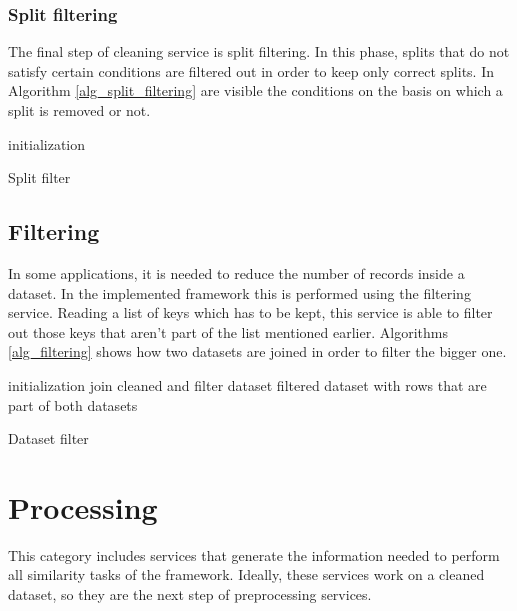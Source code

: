 \documentclass[\main/main.tex]{subfiles}
\begin{document}
\subsubsection{Split filtering}
The final step of cleaning service is split filtering. In this phase, splits that do not satisfy certain conditions are filtered out in order to keep only correct splits. In Algorithm \ref{alg_split_filtering} are visible the conditions on the basis on which a split is removed or not. 
\begin{center}
    \begin{algorithm}[H]
     initialization
     \caption{Split filter}
     \label{alg_split_filtering}
    \end{algorithm}
\end{center}

\subsection{Filtering}
In some applications, it is needed to reduce the number of records inside a dataset. In the implemented framework this is performed using the filtering service. Reading a list of keys which has to be kept, this service is able to filter out those keys that aren't part of the list mentioned earlier. Algorithms \ref{alg_filtering} shows how two datasets are joined in order to filter the bigger one.
\begin{center}
    \begin{algorithm}[H]
     initialization
     join cleaned and filter dataset
     \Return filtered dataset with rows that are part of both datasets
     \caption{Dataset filter}
     \label{alg_filtering}
    \end{algorithm}
\end{center}

\section{Processing}
This category includes services that generate the information needed to perform all similarity tasks of the framework. Ideally, these services work on a cleaned dataset, so they are the next step of preprocessing services. 
\end{document}
